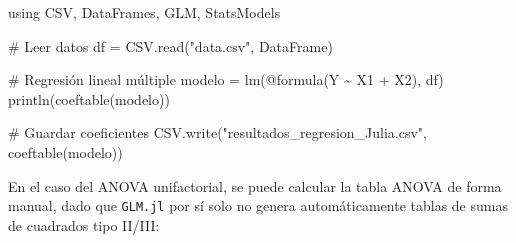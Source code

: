 \documentclass[
  letterpaper,
  DIV=11,
  numbers=noendperiod]{scrartcl}
\newenvironment{Shaded}{\begin{snugshade}}{\end{snugshade}}
\newcommand{\BuiltInTok}[1]{\textcolor[rgb]{0.00,0.23,0.31}{#1}}
\newcommand{\CommentTok}[1]{\textcolor[rgb]{0.37,0.37,0.37}{#1}}
\newcommand{\FunctionTok}[1]{\textcolor[rgb]{0.28,0.35,0.67}{#1}}
\newcommand{\ImportTok}[1]{\textcolor[rgb]{0.00,0.46,0.62}{#1}}
\newcommand{\NormalTok}[1]{\textcolor[rgb]{0.00,0.23,0.31}{#1}}
\newcommand{\OperatorTok}[1]{\textcolor[rgb]{0.37,0.37,0.37}{#1}}
\newcommand{\PreprocessorTok}[1]{\textcolor[rgb]{0.68,0.00,0.00}{#1}}
\newcommand{\StringTok}[1]{\textcolor[rgb]{0.13,0.47,0.30}{#1}}
\begin{document}
\begin{Shaded}
\begin{Highlighting}[]
\ImportTok{using} \BuiltInTok{CSV}\NormalTok{, }\BuiltInTok{DataFrames}\NormalTok{, }\BuiltInTok{GLM}\NormalTok{, }\BuiltInTok{StatsModels}

\CommentTok{\# Leer datos}
\NormalTok{df }\OperatorTok{=}\NormalTok{ CSV.}\FunctionTok{read}\NormalTok{(}\StringTok{"data.csv"}\NormalTok{, DataFrame)}

\CommentTok{\# Regresión lineal múltiple}
\NormalTok{modelo }\OperatorTok{=} \FunctionTok{lm}\NormalTok{(}\PreprocessorTok{@formula}\NormalTok{(Y }\OperatorTok{\textasciitilde{}}\NormalTok{ X1 }\OperatorTok{+}\NormalTok{ X2), df)}
\FunctionTok{println}\NormalTok{(}\FunctionTok{coeftable}\NormalTok{(modelo))}

\CommentTok{\# Guardar coeficientes}
\NormalTok{CSV.}\FunctionTok{write}\NormalTok{(}\StringTok{"resultados\_regresion\_Julia.csv"}\NormalTok{, }\FunctionTok{coeftable}\NormalTok{(modelo))}
\end{Highlighting}
\end{Shaded}

En el caso del ANOVA unifactorial, se puede calcular la tabla ANOVA de
forma manual, dado que \texttt{GLM.jl} por sí solo no genera
automáticamente tablas de sumas de cuadrados tipo II/III:
\end{document}
